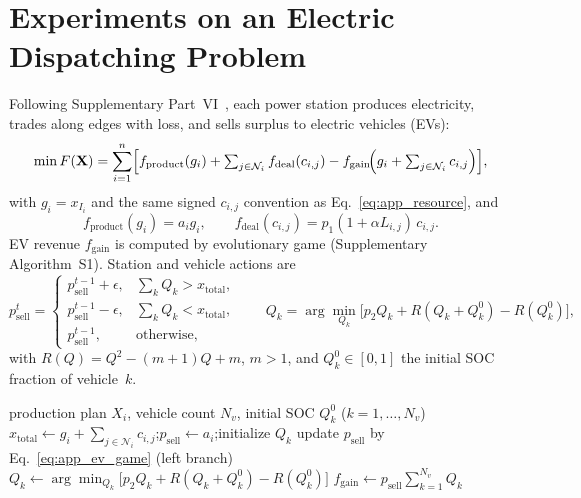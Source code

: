 \section{Experiments on an Electric Dispatching Problem}\label{app:ev}
Following Supplementary Part~VI~\cite{ref_macpo}, each power station produces electricity, trades along edges with loss, and sells surplus to electric vehicles (EVs):
\begin{equation}
\min F(\mathbf{X})=\sum_{i=1}^{n}\Bigl[f_{\mathrm{product}}(g_i)+\textstyle\sum_{j\in\mathcal{N}_i}f_{\mathrm{deal}}(c_{i,j})-f_{\mathrm{gain}}\!\Bigl(g_i+\textstyle\sum_{j\in\mathcal{N}_i}c_{i,j}\Bigr)\Bigr],
\label{eq:app_ev_global}
\end{equation}
with $g_i=x_{I_i}$ and the same signed $c_{i,j}$ convention as Eq.~\eqref{eq:app_resource}, and
\begin{equation}
f_{\mathrm{product}}(g_i)=a_i g_i,\qquad
f_{\mathrm{deal}}(c_{i,j})=p_1(1+\alpha L_{i,j})\,c_{i,j}.
\label{eq:app_ev_costs}
\end{equation}
EV revenue $f_{\mathrm{gain}}$ is computed by evolutionary game (Supplementary Algorithm~S1). Station and vehicle actions are
\begin{equation}
p_{\mathrm{sell}}^{t}\!=\!\begin{cases}
p_{\mathrm{sell}}^{t-1}+\epsilon, & \sum_k Q_k > x_{\mathrm{total}},\\
p_{\mathrm{sell}}^{t-1}-\epsilon, & \sum_k Q_k < x_{\mathrm{total}},\\
p_{\mathrm{sell}}^{t-1}, & \text{otherwise},
\end{cases}
\qquad
Q_k=\arg\min_{Q_k}\bigl[p_2 Q_k+R(Q_k+Q_k^0)-R(Q_k^0)\bigr],
\label{eq:app_ev_game}
\end{equation}
with $R(Q)=Q^2-(m+1)Q+m$, $m>1$, and $Q_k^0\in[0,1]$ the initial SOC fraction of vehicle~$k$.

\begin{algorithm}[H]
\caption{Gain calculation at station $i$ (Supplementary Algorithm~S1~\cite{ref_macpo})}
\label{alg:ev_gain}
\begin{algorithmic}[1]
\Require production plan $X_i$, vehicle count $N_v$, initial SOC $Q_k^0$ ($k=1,\ldots,N_v$)
\State $x_{\mathrm{total}}\gets g_i+\sum_{j\in\mathcal{N}_i}c_{i,j}$;\quad $p_{\mathrm{sell}}\gets a_i$;\quad initialize $Q_k$
  \State update $p_{\mathrm{sell}}$ by Eq.~\eqref{eq:app_ev_game} (left branch)
    \State $Q_k\gets\arg\min_{Q_k}\bigl[p_2 Q_k+R(Q_k+Q_k^0)-R(Q_k^0)\bigr]$
  \EndFor
\EndWhile
\State $f_{\mathrm{gain}}\gets p_{\mathrm{sell}}\sum_{k=1}^{N_v} Q_k$
\end{algorithmic}
\end{algorithm}

